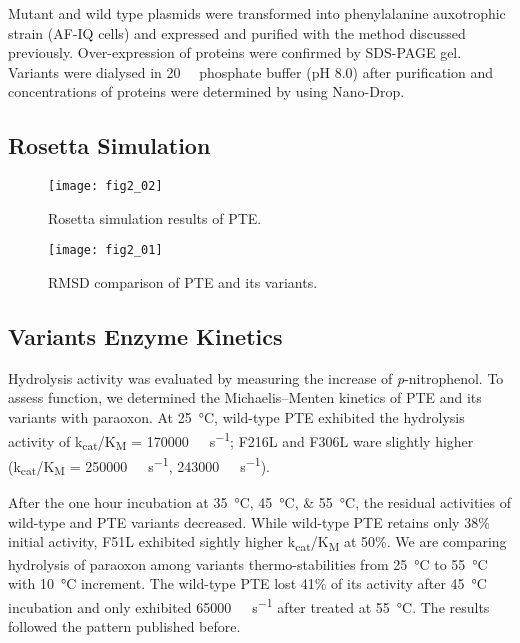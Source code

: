 \begin{refsection}
Mutant and wild type plasmids were transformed into  phenylalanine
auxotrophic strain (AF-IQ cells) and expressed and purified with the method
discussed  previously.\cite{Yang2014a} Over-expression of proteins were
confirmed by SDS-PAGE gel. Variants were dialysed in \SI{20}{\milli\Molar}
phosphate buffer (pH 8.0) after purification and concentrations of proteins
were determined by using Nano-Drop.

\subsection{Rosetta Simulation}

\begin{figure}[h!] \centering \texttt{[image: fig2\_02]}
    \caption[Rosetta simulation results of PTE.]{Rosetta simulation results of PTE.}
    \label{fig:rosetta-pte-chap2}
\end{figure}

\begin{figure}[h!] \centering \texttt{[image: fig2\_01]}
    \caption[RMSD comparison of PTE and its variants.]{RMSD comparison of PTE
    and its variants.} \label{fig:rmsd-pte-chap2}
\end{figure}

\subsection{Variants Enzyme Kinetics}

Hydrolysis activity was evaluated by measuring the increase of
\emph{p}-nitrophenol. To assess function, we determined the Michaelis–Menten
kinetics of PTE and its variants with paraoxon. At \SI{25}{\celsius},
wild-type PTE exhibited the hydrolysis activity of
k\textsubscript{cat}/K\textsubscript{M} = \SI{170000}{\per\Molar\per\second};
F216L and F306L ware slightly higher (k\textsubscript{cat}/K\textsubscript{M} =
\SI{250000}{\per\Molar\per\second}, \SI{243000}{\per\Molar\per\second}). 

After the one hour incubation at \SIlist{35;45;55}{\celsius}, the residual
activities of wild-type and PTE variants decreased. While wild-type PTE retains
only 38\% initial activity, F51L exhibited sightly higher
k\textsubscript{cat}/K\textsubscript{M} at 50\%. We are comparing hydrolysis of
paraoxon among variants thermo-stabilities from \SI{25}{\celsius} to
\SI{55}{\celsius} with \SI{10}{\celsius} increment. The wild-type PTE lost 41\%
of its activity after \SI{45}{\celsius} incubation and only exhibited
\SI{65000}{\per\Molar\per\second} after treated at \SI{55}{\celsius}. The
results followed the pattern published before.\cite{Yang2014a} 


\end{refsection}
